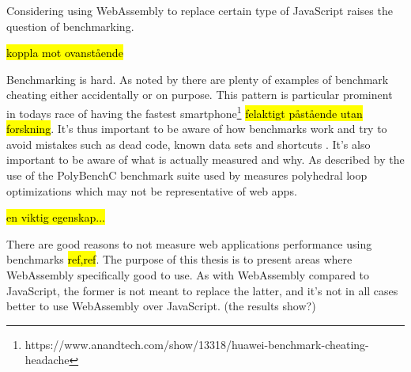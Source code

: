 
Considering using WebAssembly to replace certain type of JavaScript raises the question of benchmarking. 

\hl{koppla mot ovanstående}


Benchmarking is hard. As noted by \textcite{CaiNerurkarWu1998} there are plenty of examples of benchmark cheating either accidentally or on purpose. This pattern is particular prominent in todays race of having the fastest smartphone\footnote{https://www.anandtech.com/show/13318/huawei-benchmark-cheating-headache} \hl{felaktigt påstående utan forskning}. It's thus important to be aware of how benchmarks work and try to avoid mistakes such as dead code, known data sets and shortcuts \parencite{CaiNerurkarWu1998}. It's also important to be aware of what is actually measured and why. As described by \textcite{JangdaPowersGuhaBerger2019} the use of the PolyBenchC benchmark suite used by \textcite{HaasRossbergSchuffTitzerHolmanGohmanWagnerZakaiBastien2017} measures polyhedral loop optimizations which may not be representative of web apps.

\hl{en viktig egenskap...}

There are good reasons to not measure web applications performance using benchmarks \hl{ref,ref}. The purpose of this thesis is to present areas where WebAssembly specifically good to use. As with WebAssembly compared to JavaScript, the former is not meant to replace the latter, and it's not in all cases better to use WebAssembly over JavaScript. (the results show?)









